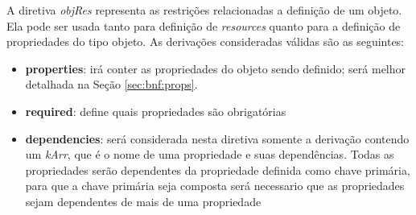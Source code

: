 \label{sec:bnf:obj}
A diretiva \textit{objRes} representa as restrições relacionadas a definição de um objeto. Ela pode ser usada tanto para definição de \textit{resources} quanto para a definição de propriedades do tipo objeto. As derivações consideradas válidas são as seguintes:

\begin{itemize}
    \item \textbf{properties}: irá conter as propriedades do objeto sendo definido; será melhor detalhada na Seção \ref{sec:bnf:props}.


    \item \textbf{required}: define quais propriedades são obrigatórias

    \item \textbf{dependencies}: será considerada nesta diretiva somente a derivação contendo um \textit{kArr}, que é o nome de uma propriedade e suas dependências. Todas as propriedades serão dependentes da propriedade definida como chave primária, para que a chave primária seja composta será necessario que as propriedades sejam dependentes de mais de uma propriedade
\end{itemize}

